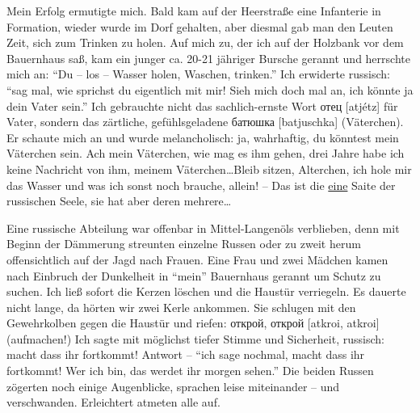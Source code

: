 Mein Erfolg ermutigte mich. Bald kam auf der Heerstraße eine Infanterie in Formation, wieder wurde im Dorf gehalten, aber diesmal gab man den Leuten Zeit, sich zum Trinken zu holen. Auf mich zu, der ich auf der Holzbank vor dem Bauernhaus saß, kam ein junger ca. 20-21 jähriger Bursche gerannt und herrschte mich an: \enquote{Du -- los -- Wasser holen, Waschen, trinken.} Ich erwiderte russisch: \enquote{sag mal, wie sprichst du eigentlich mit mir! Sieh mich doch mal an, ich könnte ja dein Vater sein.} Ich gebrauchte nicht das sachlich-ernste Wort отец [atjétz] für Vater, sondern das zärtliche, gefühlsgeladene батюшка [batjuschka] (Väterchen). Er schaute mich an und wurde melancholisch: ja, wahrhaftig, du könntest mein Väterchen sein. Ach mein Väterchen, wie mag es ihm gehen, drei Jahre habe ich keine Nachricht von ihm, meinem Väterchen\dots Bleib  sitzen, Alterchen, ich hole mir das Wasser und was ich sonst noch brauche, allein! -- Das ist die \underline{eine} Saite der russischen Seele, sie hat aber deren mehrere\dots

Eine russische Abteilung war offenbar in Mittel-Langenöls verblieben, denn mit Beginn der Dämmerung streunten einzelne Russen oder zu zweit herum offensichtlich auf der Jagd nach Frauen. Eine Frau und zwei Mädchen kamen nach Einbruch der Dunkelheit in \enquote{mein} Bauernhaus gerannt um Schutz zu suchen. Ich ließ sofort die Kerzen löschen und die Haustür verriegeln. Es dauerte nicht lange, da hörten wir zwei Kerle ankommen. Sie schlugen mit den Gewehrkolben gegen die Haustür und riefen: открой, открой [atkroi, atkroi] (aufmachen!) Ich sagte mit möglichst tiefer Stimme und Sicherheit, russisch: macht dass ihr fortkommt! Antwort -- \enquote{ich sage nochmal, macht dass ihr fortkommt! Wer ich bin, das werdet ihr morgen sehen.} Die beiden Russen zögerten noch einige Augenblicke, sprachen leise miteinander -- und verschwanden. Erleichtert atmeten alle auf.

